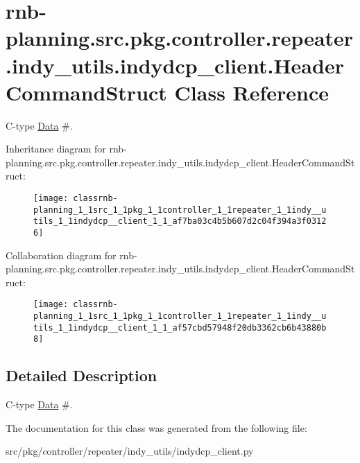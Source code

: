\hypertarget{classrnb-planning_1_1src_1_1pkg_1_1controller_1_1repeater_1_1indy__utils_1_1indydcp__client_1_1_header_command_struct}{}\section{rnb-\/planning.src.\+pkg.\+controller.\+repeater.\+indy\+\_\+utils.\+indydcp\+\_\+client.\+Header\+Command\+Struct Class Reference}
\label{classrnb-planning_1_1src_1_1pkg_1_1controller_1_1repeater_1_1indy__utils_1_1indydcp__client_1_1_header_command_struct}


C-\/type \hyperlink{classrnb-planning_1_1src_1_1pkg_1_1controller_1_1repeater_1_1indy__utils_1_1indydcp__client_1_1_data}{Data} \#.  




Inheritance diagram for rnb-\/planning.src.\+pkg.\+controller.\+repeater.\+indy\+\_\+utils.\+indydcp\+\_\+client.\+Header\+Command\+Struct\+:\nopagebreak
\begin{figure}[H]
\begin{center}
\leavevmode
\texttt{[image: classrnb-planning\_1\_1src\_1\_1pkg\_1\_1controller\_1\_1repeater\_1\_1indy\_\_utils\_1\_1indydcp\_\_client\_1\_1\_af7ba03c4b5b607d2c04f394a3f03126]}
\end{center}
\end{figure}


Collaboration diagram for rnb-\/planning.src.\+pkg.\+controller.\+repeater.\+indy\+\_\+utils.\+indydcp\+\_\+client.\+Header\+Command\+Struct\+:\nopagebreak
\begin{figure}[H]
\begin{center}
\leavevmode
\texttt{[image: classrnb-planning\_1\_1src\_1\_1pkg\_1\_1controller\_1\_1repeater\_1\_1indy\_\_utils\_1\_1indydcp\_\_client\_1\_1\_af57cbd57948f20db3362cb6b43880b8]}
\end{center}
\end{figure}


\subsection{Detailed Description}
C-\/type \hyperlink{classrnb-planning_1_1src_1_1pkg_1_1controller_1_1repeater_1_1indy__utils_1_1indydcp__client_1_1_data}{Data} \#. 

The documentation for this class was generated from the following file\+:\begin{DoxyCompactItemize}
\item 
src/pkg/controller/repeater/indy\+\_\+utils/indydcp\+\_\+client.\+py\end{DoxyCompactItemize}
